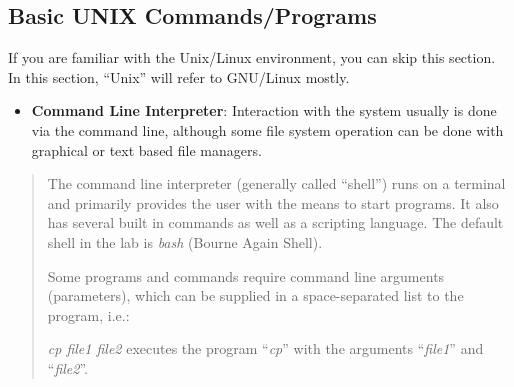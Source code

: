 \documentclass[
]{article}
\begin{document}
\hypertarget{basic-unix-commandsprograms}{%
\subsection{Basic UNIX
Commands/Programs}\label{basic-unix-commandsprograms}}

If you are familiar with the Unix/Linux environment, you can skip this
section. In this section, ``Unix'' will refer to GNU/Linux mostly.

\begin{itemize}
\item
  \textbf{Command Line Interpreter}: Interaction with the system usually
  is done via the command line, although some file system operation can
  be done with graphical or text based file managers.
\end{itemize}

\begin{quote}
The command line interpreter (generally called ``shell'') runs on a
terminal and primarily provides the user with the means to start
programs. It also has several built in commands as well as a scripting
language. The default shell in the lab is \emph{bash} (Bourne Again
Shell).

Some programs and commands require command line arguments (parameters),
which can be supplied in a space-separated list to the program, i.e.:

\emph{cp file1 file2} executes the program ``\emph{cp}'' with the
arguments ``\emph{file1}'' and ``\emph{file2}''.
\end{quote}
\end{document}
